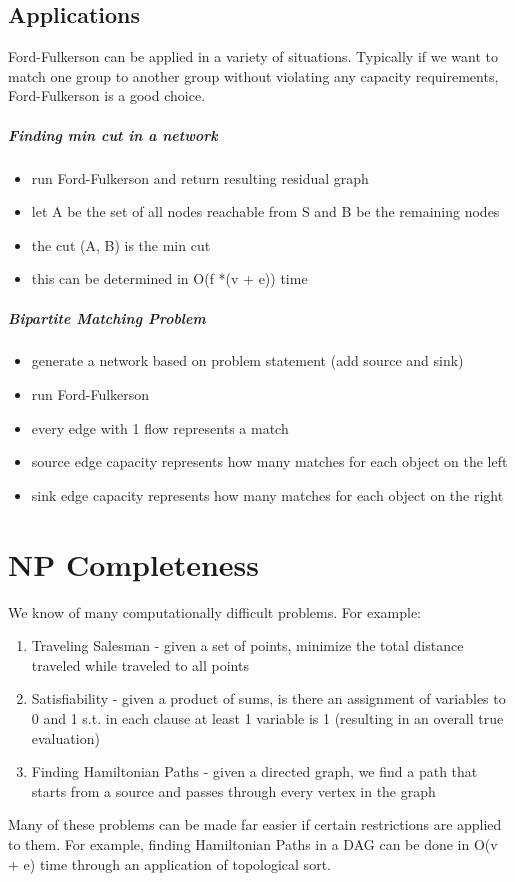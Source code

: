 \section{Applications}
Ford-Fulkerson can be applied in a variety of situations. Typically if we want to match one group to another group without violating any capacity requirements, Ford-Fulkerson is a good choice.
\paragraph{Finding min cut in a network}
\begin{itemize}
    \item run Ford-Fulkerson and return resulting residual graph
    \item let A be the set of all nodes reachable from S and B be the remaining nodes
    \item the cut (A, B) is the min cut
    \item this can be determined in O(f *(v + e)) time
\end{itemize}

\paragraph{Bipartite Matching Problem}
\begin{itemize}
    \item generate a network based on problem statement (add source and sink)
    \item run Ford-Fulkerson
    \item every edge with 1 flow represents a match
    \item source edge capacity represents how many matches for each object on the left
    \item sink edge capacity represents how many matches for each object on the right
    
\end{itemize}



\chapter{NP Completeness}
We know of many computationally difficult problems. For example:
\begin{enumerate}
    \item Traveling Salesman - given a set of points, minimize the total distance traveled while traveled to all points
    \item Satisfiability - given a product of sums, is there an assignment of variables to 0 and 1 s.t. in each clause at least 1 variable is 1 (resulting in an overall true evaluation)
    \item Finding Hamiltonian Paths - given a directed graph, we find a path that starts from a source and passes through every vertex in the graph
\end{enumerate}
Many of these problems can be made far easier if certain restrictions are applied to them. For example, finding Hamiltonian Paths in a DAG can be done in O(v + e) time through an application of topological sort.

